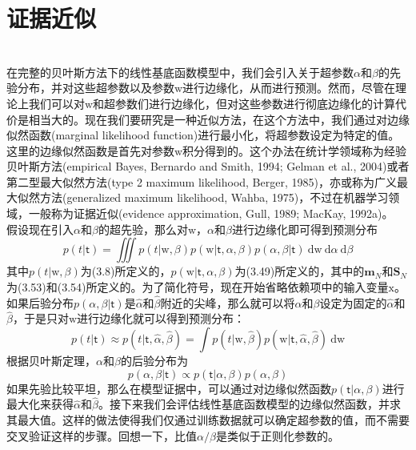 \documentclass[b5paper]{book}
\numberwithin{equation}{chapter}
\newcommand {\bx} {\boldsymbol{\mathrm{x}}}
\newcommand {\bw} {\boldsymbol{\mathrm{w}}}
\newcommand {\sft} {\boldsymbol{\mathsf{t}}}
\newcommand {\rmd} {\mathrm{d}}
\newcommand {\insertline} {\noindent{\color{red} \rule[5pt]{\textwidth}{0.1em}}}
\begin{document}
	\section{证据近似}
	\insertline\\
	\textnormal{
	\indent 在完整的贝叶斯方法下的线性基底函数模型中，我们会引入关于超参数$\alpha$和$\beta$的先验分布，并对这些超参数以及参数$\bw$进行边缘化，从而进行预测。然而，尽管在理论上我们可以对$\bw$和超参数们进行边缘化，但对这些参数进行彻底边缘化的计算代价是相当大的。现在我们要研究是一种近似方法，在这个方法中，我们通过对边缘似然函数(marginal likelihood function)进行最小化，将超参数设定为特定的值。这里的边缘似然函数是首先对参数$\bw$积分得到的。这个办法在统计学领域称为经验贝叶斯方法(empirical Bayes, Bernardo and Smith, 1994; Gelman et al., 2004)或者第二型最大似然方法(type 2 maximum likelihood, Berger, 1985)，亦或称为广义最大似然方法(generalized maximum likelihood, Wahba, 1975)，不过在机器学习领域，一般称为证据近似(evidence approximation, Gull, 1989; MacKay, 1992a)。\\
	\indent 假设现在引入$\alpha$和$\beta$的超先验，那么对$\bw$，$\alpha$和$\beta$进行边缘化即可得到预测分布
	\begin{equation}
		p(t|\sft) = \iiint p(t|\bw, \beta)p(\bw|\sft,\alpha,\beta)p(\alpha, \beta|\sft)\ \rmd \bw \ \rmd \alpha \ \rmd \beta
	\end{equation}
	其中$p(t|\bw, \beta)$为(3.8)所定义的，$p(\bw|\sft, \alpha, \beta)$为(3.49)所定义的，其中的$\mathbf{m}_N$和$\mathbf{S}_N$为(3.53)和(3.54)所定义的。为了简化符号，现在开始省略依赖项中的输入变量$\bx$。如果后验分布$p(\alpha,\beta|\sft)$是$\hat{\alpha}$和$\hat{\beta}$附近的尖峰，那么就可以将$\alpha$和$\beta$设定为固定的$\hat{\alpha}$和$\hat{\beta}$，于是只对$\bw$进行边缘化就可以得到预测分布：
	\begin{equation}
		p(t|\sft) \approx p(t|\sft, \hat{\alpha}, \hat{\beta}) = \int p(t|\bw, \hat{\beta})p(\bw|\sft, \hat{\alpha}, \hat{\beta})\ \rmd \bw
	\end{equation}
	根据贝叶斯定理，$\alpha$和$\beta$的后验分布为
	\begin{equation}
		p(\alpha, \beta|\sft) \propto p(\sft|\alpha , \beta)p(\alpha , \beta)
	\end{equation}
	如果先验比较平坦，那么在模型证据中，可以通过对边缘似然函数$p(\sft|\alpha,\beta)$进行最大化来获得$\hat{\alpha}$和$\hat{\beta}$。接下来我们会评估线性基底函数模型的边缘似然函数，并求其最大值。这样的做法使得我们仅通过训练数据就可以确定超参数的值，而不需要交叉验证这样的步骤。回想一下，比值$\alpha/\beta$是类似于正则化参数的。\\
}
\end{document}
